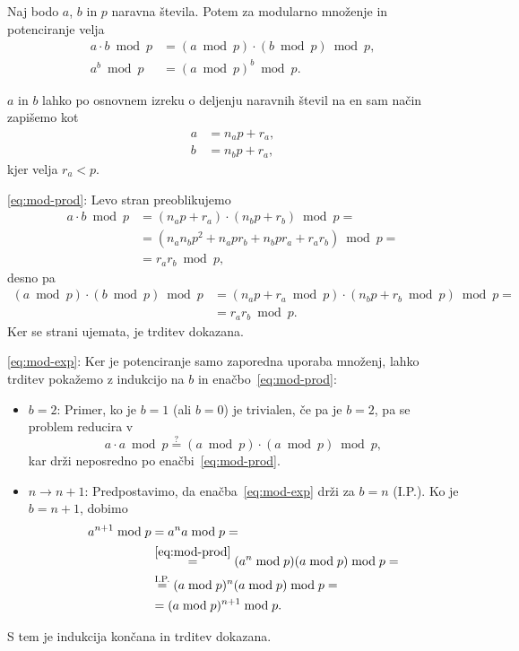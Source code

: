 \documentclass[isrm2, tisk]{fmfdelo}
\begin{document}
\begin{trditev}
\label{trd:mod-mn-pt}
    Naj bodo $a$, $b$ in $p$ naravna števila. Potem za modularno množenje in potenciranje velja
    \begin{align}
        a \cdot b \bmod p &= (a \bmod p) \cdot (b \bmod p) \bmod p, \label{eq:mod-prod} \\
        a^b \bmod p &= (a \bmod p)^b \bmod p. \label{eq:mod-exp} 
    \end{align}
\end{trditev}
\begin{dokaz}
    $a$ in $b$ lahko po osnovnem izreku o deljenju naravnih števil na en sam način zapišemo kot 
    \begin{align*}
        a &= n_a p + r_a, \\
        b &= n_b p + r_a,
    \end{align*}
    kjer velja $r_a < p$.

    \eqref{eq:mod-prod}: Levo stran preoblikujemo
    \begin{align*}
        a \cdot b \bmod p &= (n_a p + r_a) \cdot (n_b p + r_b) \bmod p = \\
                          &= (n_a n_b p^2 + n_a p r_b + n_b p r_a + r_a r_b) \bmod p = \\
                          &= r_a r_b \bmod p,
    \end{align*}
    desno pa
    \begin{align*}
        (a \bmod p) \cdot (b \bmod p) \bmod p &= (n_a p + r_a \bmod p) \cdot (n_b p + r_b \bmod p) \bmod p = \\
                          &= r_a r_b \bmod p.
    \end{align*}
    Ker se strani ujemata, je trditev dokazana.

    \eqref{eq:mod-exp}: Ker je potenciranje samo zaporedna uporaba množenj, lahko trditev pokažemo z 
    indukcijo na $b$ in enačbo~\eqref{eq:mod-prod}:
    \begin{itemize}
        \item $b = 2$: Primer, ko je $b = 1$ (ali $b = 0$) je trivialen, če pa je $b = 2$, pa se 
            problem reducira v 
            $$ 
            a \cdot a \bmod p \stackrel{?}{=} (a \bmod p) \cdot (a \bmod p) \bmod p,
            $$
            kar drži neposredno po enačbi~\eqref{eq:mod-prod}.
        \item $n \rightarrow n + 1$: Predpostavimo, da enačba~\eqref{eq:mod-exp} drži za $b = n$ (I.P.). 
            Ko je $b = n + 1$, dobimo 
            \begin{align*}
                a^{n + 1} \bmod p &= a^n a \bmod p = \\ 
                                  &\stackrel{\eqref{eq:mod-prod}}{=} (a^n \bmod p) (a \bmod p) \bmod p = \\
                                  &\stackrel{\text{I.P.}}{=} (a \bmod p)^n (a \bmod p) \bmod p = \\
                                  &= (a \bmod p)^{n + 1} \bmod p.
            \end{align*}
    \end{itemize}
    S tem je indukcija končana in trditev dokazana.
\end{dokaz}
\end{document}
